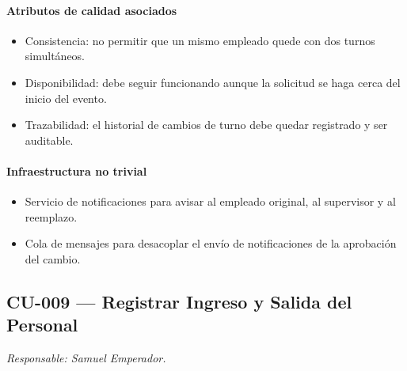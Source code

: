 \paragraph{Atributos de calidad asociados}
\begin{itemize}[leftmargin=1.4em, topsep=1pt]
  \item Consistencia: no permitir que un mismo empleado quede con dos turnos simultáneos.
  \item Disponibilidad: debe seguir funcionando aunque la solicitud se haga cerca del inicio del evento.
  \item Trazabilidad: el historial de cambios de turno debe quedar registrado y ser auditable.
\end{itemize}

\paragraph{Infraestructura no trivial}
\begin{itemize}[leftmargin=1.4em, topsep=1pt]
  \item Servicio de notificaciones para avisar al empleado original, al supervisor y al reemplazo.
  \item Cola de mensajes para desacoplar el envío de notificaciones de la aprobación del cambio.
\end{itemize}

\subsection{CU-009 --- Registrar Ingreso y Salida del Personal}
\label{cu:cu-009}
\textit{Responsable: Samuel Emperador.}

